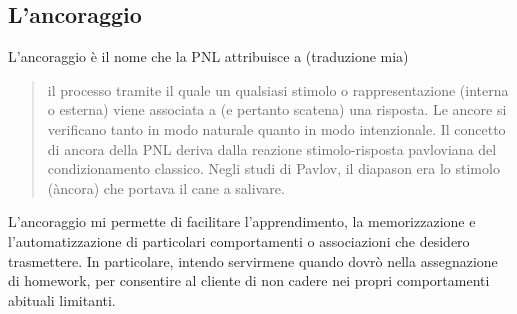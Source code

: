 \subsection{L'ancoraggio}
\label{sub:ancoraggio}
L'ancoraggio è il nome che la PNL attribuisce a (traduzione mia)

\begin{quotation}
il processo tramite il quale un qualsiasi stimolo o rappresentazione (interna o esterna) viene associata a (e pertanto scatena) una risposta. Le ancore si verificano tanto in modo naturale quanto in modo intenzionale. Il concetto di ancora della PNL deriva dalla reazione stimolo-risposta pavloviana del condizionamento classico. Negli studi di Pavlov, il diapason era lo stimolo (àncora) che portava il cane a salivare.\cite{magic}
\end{quotation} 

\noindent L'ancoraggio mi permette di facilitare l'apprendimento, la memorizzazione e l'automatizzazione di particolari comportamenti o associazioni che desidero trasmettere. In particolare, intendo servirmene quando dovrò nella assegnazione di homework, per consentire al cliente di non cadere nei propri comportamenti abituali limitanti.


